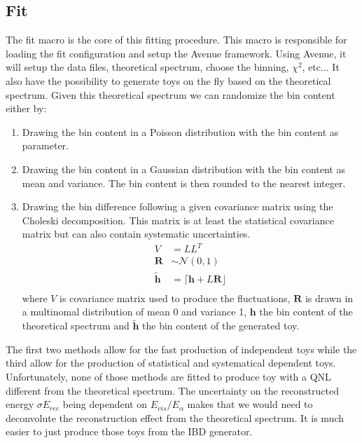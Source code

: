 \documentclass[../main.tex]{subfiles}
\begin{document}
%

\subsection{Fit}
\label{sec:joint_fit:framework:fit}

The fit macro is the core of this fitting procedure. This macro is responsible for loading the fit configuration and setup the Avenue framework. Using Avenue, it will setup the data files, theoretical spectrum, choose the binning, $\chi^2$, etc... It also have the possibility to generate toys on the fly based on the theoretical spectrum. Given this theoretical spectrum we can randomize the bin content either by:
\begin{enumerate}
  \item Drawing the bin content in a Poisson distribution with the bin content as parameter.
  \item Drawing the bin content in a Gaussian distribution with the bin content as mean and variance. The bin content is then rounded to the nearest integer.
  \item Drawing the bin difference following a given covariance matrix using the Choleski decomposition. This matrix is at least the statistical covariance matrix but can also contain systematic uncertainties.
    \begin{align}
      V &= LL^T \\
      \mathbf{R} &\sim \mathcal{N}(0, 1) \\
      \tilde{\mathbf{h}} &= \lceil \mathbf{h} + L\mathbf{R} \rfloor \\
    \end{align}
    where $V$ is covariance matrix used to produce the fluctuations, $\mathbf{R}$ is drawn in a multinomal distribution of mean 0 and variance 1, $\mathbf{h}$ the bin content of the theoretical spectrum and $\tilde{\mathbf{h}}$ the bin content of the generated toy.
\end{enumerate}

The first two methods allow for the fast production of independent toys while the third allow for the production of statistical and systematical dependent toys. Unfortunately, none of those methods are fitted to produce toy with a QNL different from the theoretical spectrum. The uncertainty on the reconstructed energy $\sigma E_{rec}$ being dependent on $E_{vis}/E_{\alpha}$ makes that we would need to deconvolute the reconstruction effect from the theoretical spectrum. It is much easier to just produce those toys from the IBD generator.
\end{document}
